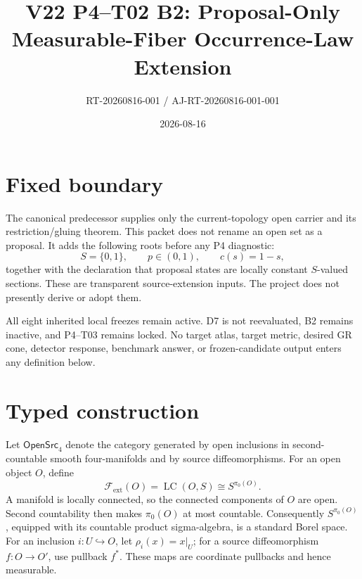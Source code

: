 \documentclass[11pt]{article}
\title{V22 P4--T02 B2: Proposal-Only Measurable-Fiber Occurrence-Law Extension}
\author{RT-20260816-001 / AJ-RT-20260816-001-001}
\date{2026-08-16}
\newcommand{\Fext}{\mathcal F_{\mathrm{ext}}}
\begin{document}
\maketitle

\begin{center}
\end{center}

\section{Fixed boundary}

The canonical predecessor supplies only the current-topology open carrier and
its restriction/gluing theorem.  This packet does not rename an open set as a
proposal.  It adds the following roots before any P4 diagnostic:
\[
 S=\{0,1\},\qquad p\in(0,1),\qquad c(s)=1-s,
\]
together with the declaration that proposal states are locally constant
$S$-valued sections.  These are transparent source-extension inputs.  The
project does not presently derive or adopt them.

All eight inherited local freezes remain active.  D7 is not reevaluated, B2
remains inactive, and P4--T03 remains locked.  No target atlas, target metric,
desired GR cone, detector response, benchmark answer, or frozen-candidate
output enters any definition below.

\section{Typed construction}

Let $\mathsf{OpenSrc}_{4}$ denote the category generated by open inclusions in
second-countable smooth four-manifolds and by source diffeomorphisms.  For an
open object $O$, define
\[
 \Fext(O)=\operatorname{LC}(O,S)\cong S^{\pi_{0}(O)}.
\]
A manifold is locally connected, so the connected components of $O$ are open.
Second countability then makes $\pi_{0}(O)$ at most countable.  Consequently
$S^{\pi_{0}(O)}$, equipped with its countable product sigma-algebra, is a
standard Borel space.  For an inclusion $i:U\hookrightarrow O$, let
$\rho_i(x)=x|_U$; for a source diffeomorphism $f:O\to O'$, use pullback
$f^{*}$.  These maps are coordinate pullbacks and hence measurable.
\end{document}
